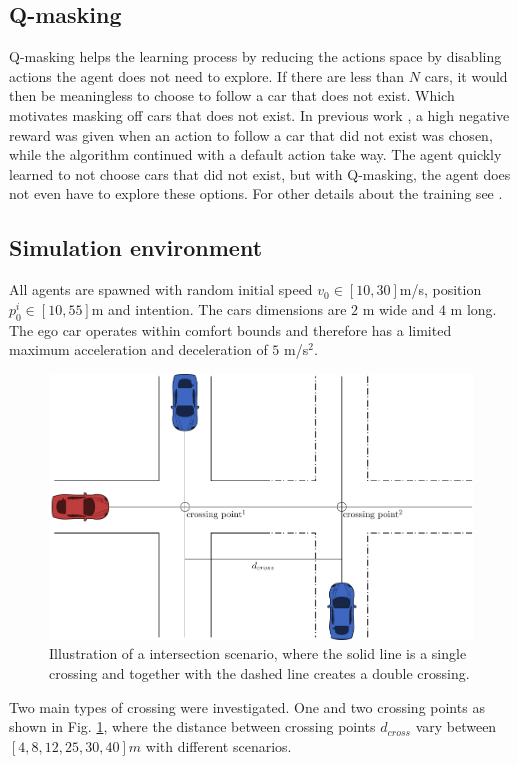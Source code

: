 \subsection{Q-masking}
\label{sec:masking}
Q-masking \cite{Mukadam2017} helps the learning process by reducing the actions space by disabling actions the agent does not need to explore. If there are less than $N$ cars, it would then be meaningless to choose to follow a car that does not exist. Which motivates masking off cars that does not exist. In previous work \cite{Tram2018LearningQ-Learning}, a high negative reward was given when an action to follow a car that did not exist was chosen, while the algorithm continued with a default action take way. The agent quickly learned to not choose cars that did not exist, but with Q-masking, the agent does not even have to explore these options. For other details about the training see \cite{Tram2018LearningQ-Learning}.

\subsection{Simulation environment}
All agents are spawned with random initial speed $v_0 \in [10,30]$m/s, position $p^i_0 \in [10,55]$m and intention. The cars dimensions are $2$ m wide and $4$ m long. The ego car operates within comfort bounds and therefore has a limited maximum acceleration and deceleration of $5$ m/s$^2$. 
\begin{figure}[t]
	\centering
	\includegraphics[width=.95\columnwidth]{figures/figures-scenarios.pdf}
	\caption{Illustration of a intersection scenario, where the solid line is a single crossing and together with the dashed line creates a double crossing.}
	\label{fig:scenario}
\end{figure}
Two main types of crossing were investigated. One and two crossing points as shown in Fig. \ref{fig:scenario}, where the distance between crossing points $d_{cross}$ vary between $[4, 8, 12, 25, 30, 40] m$ with different scenarios. 

